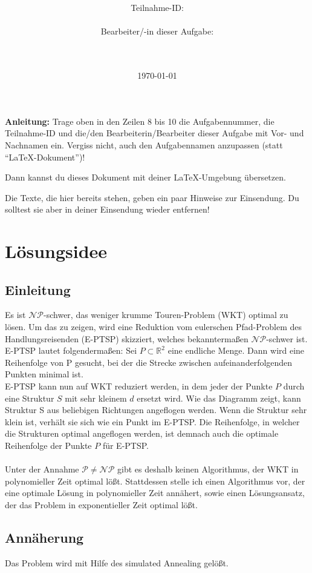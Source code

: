 \documentclass[a4paper,10pt,ngerman]{scrartcl}
\title{\textbf{\Huge\Aufgabe}}
\author{\LARGE Teilnahme-ID: \LARGE \TeilnahmeId \\\\
  \LARGE Bearbeiter/-in dieser Aufgabe: \\
  \LARGE \Name\\\\}
\date{\LARGE\today}
\begin{document}
\maketitle
\tableofcontents

\vspace{0.5cm}

\textbf{Anleitung:} Trage oben in den Zeilen 8 bis 10 die Aufgabennummer, die Teilnahme-ID und die/den Bearbeiterin/Bearbeiter dieser Aufgabe mit Vor- und Nachnamen ein.
Vergiss nicht, auch den Aufgabennamen anzupassen (statt "`\LaTeX-Dokument"')!

Dann kannst du dieses Dokument mit deiner \LaTeX-Umgebung übersetzen.

Die Texte, die hier bereits stehen, geben ein paar Hinweise zur Einsendung. Du
solltest sie aber in deiner Einsendung wieder entfernen!

\section{Lösungsidee}
\subsection{Einleitung}
Es ist $\mathcal{NP}$-schwer, das weniger krumme Touren-Problem (WKT) optimal zu lösen. Um das zu zeigen, wird
eine Reduktion vom eulerschen Pfad-Problem des Handlungsreisenden (E-PTSP) skizziert,
 welches bekanntermaßen $\mathcal{NP}$-schwer ist.
 E-PTSP lautet folgendermaßen: Sei $P \subset \mathbb{R}^2$ eine endliche Menge. Dann wird eine Reihenfolge von P gesucht,
 bei der die Strecke zwischen aufeinanderfolgenden Punkten minimal ist. \\
 E-PTSP kann nun auf WKT reduziert werden, in dem jeder der Punkte $P$ durch eine Struktur $S$ mit
 sehr kleinem $d$ ersetzt wird. Wie das Diagramm zeigt, kann Struktur S aus beliebigen Richtungen angeflogen werden.
 Wenn die Struktur sehr klein ist, verhält sie sich wie ein Punkt im E-PTSP. Die Reihenfolge, in welcher die Strukturen optimal angeflogen werden,
 ist demnach auch die optimale Reihenfolge der Punkte $P$ für E-PTSP. \\\\
 Unter der Annahme $\mathcal{P} \neq \mathcal{NP}$ gibt es deshalb keinen Algorithmus, der WKT in polynomieller Zeit optimal lößt.
 Stattdessen stelle ich einen Algorithmus vor, der eine optimale Lösung in polynomieller Zeit annähert,
 sowie einen Lösungsansatz, der das Problem in exponentieller Zeit optimal lößt.
 \subsection{Annäherung}
 Das Problem wird mit Hilfe des simulated Annealing gelößt.
\end{document}
